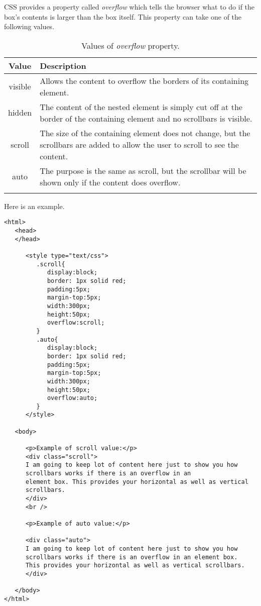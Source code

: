 \documentclass[a4paper,oneside]{book}
\numberwithin{equation}{chapter}
\begin{document}
CSS provides a property called \textit{overflow} which tells the browser what to do if the box's contents is larger than the box itself. This property can take one of the following values.
\begin{center}
\begin{longtable}{|c|p{10cm}|}
\hline
\textbf{Value} & \textbf{Description} \\
\hline
visible & Allows the content to overflow the borders of its containing element.\\
\hline
hidden & The content of the nested element is simply cut off at the border of the containing element and no scrollbars is visible.\\
\hline
scroll & The size of the containing element does not change, but the scrollbars are added to allow the user to scroll to see the content.\\
\hline
auto & The purpose is the same as scroll, but the scrollbar will be shown only if the content does overflow.\\
\hline
\caption{Values of \textit{overflow} property.}
\end{longtable}
\end{center}
Here is an example.
\begin{verbatim}
<html>
   <head>
   </head>
   
      <style type="text/css">
         .scroll{
            display:block;
            border: 1px solid red;
            padding:5px;
            margin-top:5px;
            width:300px;
            height:50px;
            overflow:scroll;
         }
         .auto{
            display:block;
            border: 1px solid red;
            padding:5px;
            margin-top:5px;
            width:300px;
            height:50px;
            overflow:auto;
         }
      </style>
      
   <body>
   
      <p>Example of scroll value:</p>
      <div class="scroll">
      I am going to keep lot of content here just to show you how 
      scrollbars works if there is an overflow in an 
      element box. This provides your horizontal as well as vertical
      scrollbars.
      </div>
      <br />
      
      <p>Example of auto value:</p>
      
      <div class="auto">
      I am going to keep lot of content here just to show you how 
      scrollbars works if there is an overflow in an element box. 
      This provides your horizontal as well as vertical scrollbars.
      </div>
      
   </body>
</html> 
\end{verbatim}
\end{document}
